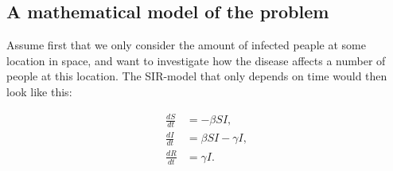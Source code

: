 \subsection{A mathematical model of the problem}
Assume first that we only consider the amount of infected
peaple at some location in space, and want to investigate
how the disease affects a number of people at this location.
The SIR-model that only depends on time would then look like
this:

\begin{align}
  \frac{dS}{dt} &= -\beta SI, \label{eq:SIR1} \\
  \frac{dI}{dt} &= \beta SI - \gamma I, \label{eq:SIR2} \\
  \frac{dR}{dt} &= \gamma I. \label{eq:SIR3}
\end{align}